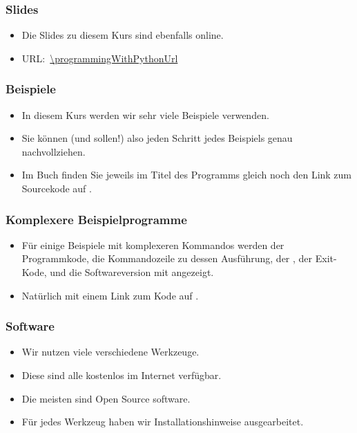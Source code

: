 \documentclass[aspectratio=169,mathserif,notheorems]{beamer}%
\begin{document}
%
\begin{frame}%
\frametitle{Slides}%
\begin{itemize}%
\item Die Slides zu diesem Kurs sind ebenfalls online.%
\item<2-> URL:~\expandafter\url{\programmingWithPythonUrl}%
\end{itemize}%
\end{frame}%
%
\begin{frame}[fragile,t]
\frametitle{Beispiele}%
\begin{itemize}%
\item In diesem Kurs werden wir sehr viele Beispiele verwenden.
\item<2-> Sie können (und sollen!) also jeden Schritt jedes Beispiels genau nachvollziehen.%
\item<3-> Im Buch finden Sie jeweils im Titel des Programms gleich noch den Link zum Sourcekode auf \github.%
\end{itemize}%
%
%
\end{frame}
%
\begin{frame}%
\frametitle{Komplexere Beispielprogramme}%
\parbox{0.435\linewidth}{%
\begin{itemize}%
\item Für einige Beispiele mit komplexeren Kommandos werden der Programmkode, die Kommandozeile zu dessen Ausführung, der \cite{J2024PTOGBSI8IS12E:SSSSIS}, der Exit-Kode\cite{J2024PTOGBSI8IS12E:TAP}, und die Softwareversion mit angezeigt.%
\item<2-> Natürlich mit einem Link zum Kode auf \github.%
\end{itemize}%
}%
%
\end{frame}%
%
\begin{frame}%
\frametitle{Software}%
\begin{itemize}%
\item Wir nutzen viele verschiedene Werkzeuge.%
\item<2-> Diese sind alle kostenlos im Internet verfügbar.%
\item<3-> Die meisten sind Open Source software.%
\item<4-> Für jedes Werkzeug haben wir Installationshinweise ausgearbeitet.%
\end{itemize}%
\end{frame}%
\end{document}
